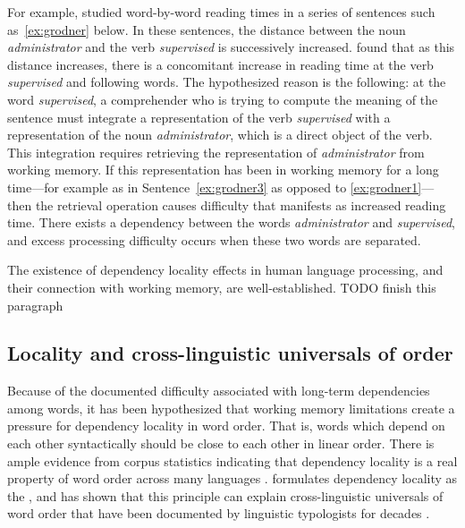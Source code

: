 For example, \citet{grodner-consequences-2005} studied word-by-word reading times in a series of sentences such as~\ref{ex:grodner} below. 
In these sentences, the distance between the noun \emph{administrator} and the verb \emph{supervised} is successively increased. \citet{grodner-consequences-2005} found that as this distance increases, there is a concomitant increase in reading time at the verb \emph{supervised} and following words. The hypothesized reason is the following: at the word \emph{supervised}, a comprehender who is trying to compute the meaning of the sentence must integrate a representation of the verb \emph{supervised} with a representation of the noun \emph{administrator}, which is a direct object of the verb. This integration requires retrieving the representation of \emph{administrator} from working memory. If this representation has been in working memory for a long time---for example as in Sentence~\ref{ex:grodner3} as opposed to \ref{ex:grodner1}---then the retrieval operation causes difficulty that manifests as increased reading time. There exists a dependency between the words \emph{administrator} and \emph{supervised}, and excess processing difficulty occurs when these two words are separated. 

The existence of dependency locality effects in human language processing, and their connection with working memory, are well-established. TODO finish this paragraph

\subsection{Locality and cross-linguistic universals of order}

Because of the documented difficulty associated with long-term dependencies among words, it has been hypothesized that working memory limitations create a pressure for dependency locality in word order. 
That is, words which depend on each other syntactically should be close to each other in linear order.
There is ample evidence from corpus statistics indicating that dependency locality is a real property of word order across many languages \citep{gildea-optimizing-2007,liu2008dependency,gildea-grammars-2010,futrell-large-scale-2015,liu-dependency-2017,temperley-minimizing-2018}. 
\citet{hawkins-performance-1994,hawkins-efficiency-2003} formulates dependency locality as the , and has shown that this principle can explain cross-linguistic universals of word order that have been documented by linguistic typologists for decades \citep{greenberg-universals-1963}. 

